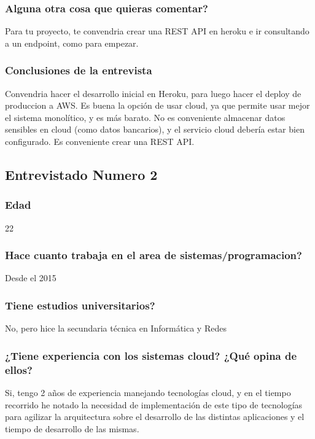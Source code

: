 \documentclass{article}
\begin{document}
\subsubsection{Alguna otra cosa que quieras comentar?}
Para tu proyecto, te convendria crear una REST API en heroku e ir consultando a un endpoint, como para empezar.

\subsubsection{Conclusiones de la entrevista}
Convendria hacer el desarrollo inicial en Heroku, para luego hacer el deploy de produccion a AWS. Es buena la opción de usar cloud,
ya que permite usar mejor el sistema monolítico, y es más barato. No es conveniente almacenar datos sensibles en cloud (como datos bancarios),
y el servicio cloud debería estar bien configurado.
Es conveniente crear una REST API.

\clearpage

\subsection{Entrevistado Numero 2}
\subsubsection{Edad}
22

\subsubsection{Hace cuanto trabaja en el area de sistemas/programacion?}
Desde el 2015

\subsubsection{Tiene estudios universitarios?}
No, pero hice la secundaria técnica en Informática y Redes

\subsubsection{¿Tiene experiencia con los sistemas cloud? ¿Qué opina de ellos?}
Si, tengo 2 años de experiencia manejando tecnologías cloud, y en el tiempo recorrido he notado la necesidad de implementación de este tipo de tecnologías para agilizar la arquitectura sobre el desarrollo de las distintas aplicaciones y el tiempo de desarrollo de las mismas.
\end{document}
